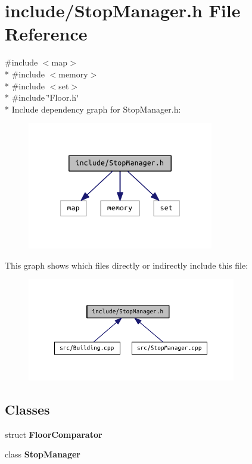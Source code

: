 \section{include/\+Stop\+Manager.h File Reference}
\label{_stop_manager_8h}
{\ttfamily \#include $<$map$>$}\\*
{\ttfamily \#include $<$memory$>$}\\*
{\ttfamily \#include $<$set$>$}\\*
{\ttfamily \#include \char`\"{}Floor.\+h\char`\"{}}\\*
Include dependency graph for Stop\+Manager.\+h\+:\nopagebreak
\begin{figure}[H]
\begin{center}
\leavevmode
\includegraphics[width=230pt]{_stop_manager_8h__incl}
\end{center}
\end{figure}
This graph shows which files directly or indirectly include this file\+:\nopagebreak
\begin{figure}[H]
\begin{center}
\leavevmode
\includegraphics[width=258pt]{_stop_manager_8h__dep__incl}
\end{center}
\end{figure}
\subsection*{Classes}
\begin{DoxyCompactItemize}
\item 
struct {\bf Floor\+Comparator}
\item 
class {\bf Stop\+Manager}
\end{DoxyCompactItemize}
